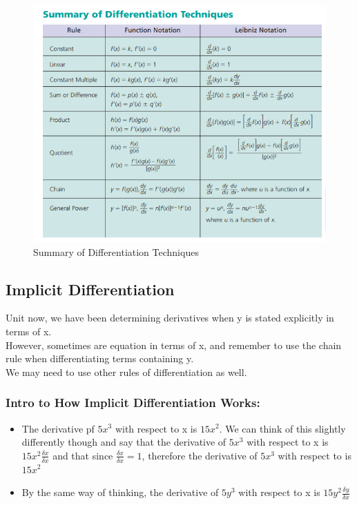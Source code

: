 \documentclass{article}
\begin{document}
\begin{center}
\begin{figure}
\includegraphics[width=1\textwidth]{imgs/summary of differentiation techniques.png}
\caption{Summary of Differentiation Techniques }
\end{figure}
\end{center}
\newpage 


\subsection{Implicit Differentiation}
Unit now, we have been determining derivatives when y is stated explicitly in terms of x.\\
However, sometimes are equation in terms of x, and remember to use the chain rule when differentiating terms containing y.\\
We may need to use other rules of differentiation as well.\\
\subsubsection{Intro to How Implicit Differentiation Works:}
\begin{itemize}
    \item The derivative pf $5x^3$ with respect to x is $15x^2$. We can think of this slightly differently though and say that the derivative of $5x^3$ with respect to x is $15x^2 \frac{\delta x}{\delta x}$ and that since $\frac{\delta x}{\delta x}=1$, therefore the derivative of $5x^3$ with respect to is $15x^2$
    \item By the same way of thinking, the derivative of $5y^3$ with respect to x is $15y^2 \frac{\delta y}{\delta x}$
\end{itemize}
\end{document}
